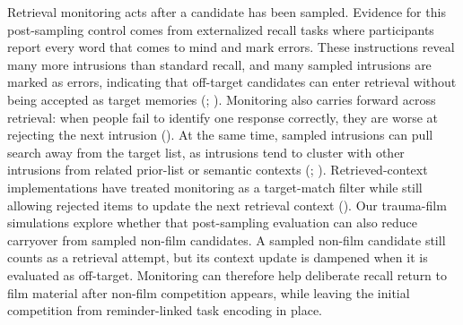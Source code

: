\documentclass[
  man,
  floatsintext,
  longtable,
  nolmodern,
  notxfonts,
  notimes,
  draftfirst,
  colorlinks=true,linkcolor=blue,citecolor=blue,urlcolor=blue]{apa7}
\begin{document}
Retrieval monitoring acts after a candidate has been sampled. Evidence
for this post-sampling control comes from externalized recall tasks
where participants report every word that comes to mind and mark errors.
These instructions reveal many more intrusions than standard recall, and
many sampled intrusions are marked as errors, indicating that off-target
candidates can enter retrieval without being accepted as target memories
(;
).
Monitoring also carries forward across retrieval: when people fail to
identify one response correctly, they are worse at rejecting the next
intrusion (). At the same time, sampled intrusions can pull search away from
the target list, as intrusions tend to cluster with other intrusions
from related prior-list or semantic contexts
(;
).
Retrieved-context implementations have treated monitoring as a
target-match filter while still allowing rejected items to update the
next retrieval context (). Our trauma-film simulations explore whether that
post-sampling evaluation can also reduce carryover from sampled non-film
candidates. A sampled non-film candidate still counts as a retrieval
attempt, but its context update is dampened when it is evaluated as
off-target. Monitoring can therefore help deliberate recall return to
film material after non-film competition appears, while leaving the
initial competition from reminder-linked task encoding in place.
\end{document}
